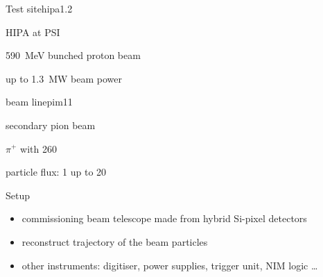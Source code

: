 \begin{bframe}{Test site}{hipa}{1.2}\hypersetup{linkcolor=white!70!black}
%
\vspace*{-.3\textheight}
\begin{bbox}{.45}
  \item \ac{HIPA} at \ac{PSI}
  \item \SI{590}{\MeV} bunched proton beam
  \item up to \SI{1.3}{\MW} beam power
\end{bbox}
%
%
\end{bframe}
\begin{bframe}{\pim beam line}{pim1}{1}
%
  \raggedleft
  \begin{bbox}{.42}
    \item secondary pion beam
    \item $\pi^+$ with \SI{260}{\mevc}
    \item particle flux: \SI{1}{\khzcm} up to \SI{20}{\mhzcm}
  \end{bbox}
%
%
\end{bframe}
\begin{frame}{Setup}
%
  \begin{itemize}\itemfill
    \item commissioning beam telescope made from hybrid Si-pixel detectors
    \item reconstruct trajectory of the beam particles
    \item other instruments: digitiser, power supplies, trigger unit, NIM logic \ldots
  \end{itemize}
%
%
\end{frame}%
